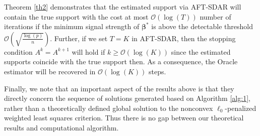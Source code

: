 \documentclass[12pt]{article}
\newtheorem{remark}{Remark}
\newcommand{\bbeta}{\boldsymbol{\beta}}
\begin{document}
Theorem \ref{th2}  demonstrates that the estimated support via AFT-SDAR will contain the true support with the cost at most   $\mathcal{O}(\log (T))$ number of iterations if the minimum signal strength of $\bbeta^*$ is above the detectable threshold  $ \mathcal{O}(\sqrt{\frac{\log(p)}{n}})$.
Further, if we set $T = K$ in AFT-SDAR, then the stopping condition $A^k = A^{k+1}$ will hold if $k \geq  \mathcal{O}(\log (K))$ since the estimated supports coincide with the true support then.
As a consequence, the Oracle estimator will be recovered in    $\mathcal{O}(\log (K))$ steps.


Finally, we note that an important aspect of the results above is that they directly concern the sequence of solutions generated based on Algorithm \ref{alg:1}, rather than a theoretically defined global solution to the nonconvex $\ell_0$-penalized weighted least squares criterion. Thus there is no gap between our theoretical results and computational algorithm.


\end{document}
